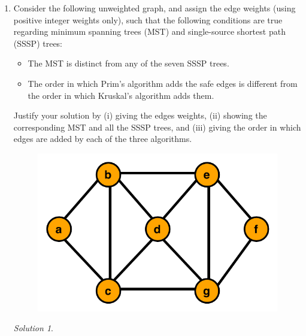 \documentclass[12pt]{article}
\theoremstyle{remark}
\newtheorem*{solution}{Solution}
\begin{document}
\begin{enumerate}
\item Consider the following unweighted graph, and assign the edge weights (using positive integer weights only), such that the following conditions are true regarding minimum spanning trees (MST) and single-source shortest path (SSSP) trees:
	\begin{itemize}
	\itemsep-0.1pt
	\item The MST is distinct from any of the seven SSSP trees.
	\item The order in which Prim's algorithm adds the safe edges is different from the order in which Kruskal's algorithm adds them.
	\end{itemize}
	Justify your solution by (i) giving the edges weights, (ii) showing the corresponding MST and all the SSSP trees, and (iii) giving the order in which edges are added by each of the three algorithms. 	
	\begin{figure}[h!]
\begin{center}
\includegraphics[scale=0.6]{graph_mst.pdf} 
\end{center}
\end{figure}

\begin{solution}

\end{solution}

\end{enumerate}
\end{document}
